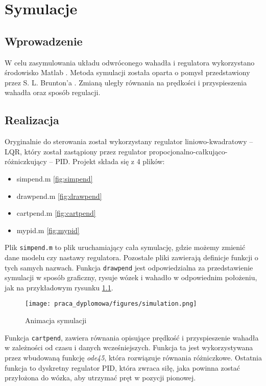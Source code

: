 \chapter{Symulacje}

\section{Wprowadzenie}
W celu zasymulowania układu odwróconego wahadła i regulatora wykorzystano środowisko Matlab \cite{matlab}. Metoda symulacji została oparta o pomysł przedstawiony przez S. L. Brunton'a \cite{Brun17}. Zmianą uległy równania na prędkości i przyspieszenia wahadła oraz sposób regulacji.

\section{Realizacja}
Oryginalnie do sterowania został wykorzystany regulator liniowo-kwadratowy -- LQR, który został  zastąpiony przez regulator propocjonalno-całkująco-różniczkujący -- PID. Projekt składa się z 4 plików:
\begin{itemize}
    \item simpend.m \ref{fig:simpend}
    \item drawpend.m \ref{fig:drawpend}
    \item cartpend.m \ref{fig:cartpend}
    \item mypid.m \ref{fig:mypid}
\end{itemize}
Plik \texttt{simpend.m} to plik uruchamiający cała symulację, gdzie możemy zmienić dane modelu czy nastawy regulatora. Pozostałe pliki zawierają definicje funkcji o tych samych nazwach. Funkcja \texttt{drawpend} jest odpowiedzialna za przedstawienie symulacji w sposób graficzny, rysuje wózek i wahadło w odpowiednim położeniu, jak na przykładowym rysunku \ref{fig:sim}.
\begin{figure}
    \centering
    \texttt{[image: praca\_dyplomowa/figures/simulation.png]}
    \caption{Animacja symulacji}
    \label{fig:sim}
\end{figure}
Funkcja \texttt{cartpend}, zawiera równania opisujące prędkość i przyspieszenie wahadła w zależności od czasu i danych wcześniejszych. Funkcja ta jest wykorzystywana przez wbudowaną funkcję \textit{ode45}, która rozwiązuje równania różniczkowe. Ostatnia funkcja to dyskretny regulator PID, która zwraca siłę, jaka powinna zostać przyłożona do wózka, aby utrzymać pręt w pozycji pionowej. 

